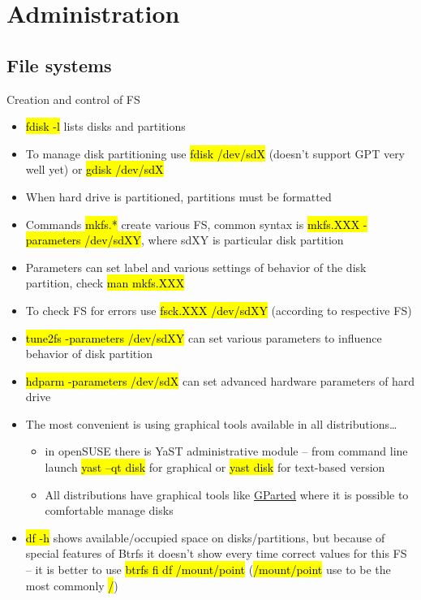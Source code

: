 \documentclass[compress, ucs, xelatex, 11pt, xcolor=svgnames,
  hyperref={
    bookmarks=true,
    unicode=true,
    colorlinks=true,
    pdftitle={Linux, command line and MetaCentrum},
    plainpages=false,
    pdfauthor={Vojtech Zeisek},
    pdfsubject={Course about use of Linux command line, writing shell scripts and using MetaCentrum of CESNET},
    pdfcreator={XeLaTeX},
    pdfkeywords={Linux, GNU, BASH, shell, command line, MetaCentrum},
    linkcolor=DarkRed,
    anchorcolor=DarkBlue,
    citecolor=Indigo,
    filecolor=NavyBlue,
    menucolor=DarkMagenta,
    urlcolor=DarkBlue,
    pdftex},
  url={hyphens, lowtilde} %
  ]{beamer}
\renewcommand{\texttt}[1]{\hl{\ttfamily #1}}
\begin{document}
\section{Administration}

\subsection{File systems}

\begin{frame}[allowframebreaks]{Creation and control of FS}
\begin{itemize}
  \item \texttt{fdisk -l} lists disks and partitions
  \item To manage disk partitioning use \texttt{fdisk /dev/sdX} (doesn't support GPT very well yet) or \texttt{gdisk /dev/sdX}
  \item When hard drive is partitioned, partitions must be formatted
  \item Commands \texttt{mkfs.*} create various FS, common syntax is \texttt{mkfs.XXX -parameters /dev/sdXY}, where sdXY is particular disk partition
  \item Parameters can set label and various settings of behavior of the disk partition, check \texttt{man mkfs.XXX}
  \item To check FS for errors use \texttt{fsck.XXX /dev/sdXY} (according to respective FS)
  \item \texttt{tune2fs -parameters /dev/sdXY} can set various parameters to influence behavior of disk partition
  \item \texttt{hdparm -parameters /dev/sdX} can set advanced hardware parameters of hard drive
  \item The most convenient is using graphical tools available in all distributions\ldots
  \begin{itemize}
    \item in openSUSE there is YaST administrative module -- from command line launch \texttt{yast --qt disk} for graphical or \texttt{yast disk} for text-based version
    \item All distributions have graphical tools like \href{http://gparted.org/}{GParted} where it is possible to comfortable manage disks
  \end{itemize}
  \item \texttt{df -h} shows available/occupied space on disks/partitions, but because of special features of Btrfs it doesn't show every time correct values for this FS -- it is better to use \texttt{btrfs fi df /mount/point} (\texttt{/mount/point} use to be the most commonly \texttt{/})
\end{itemize}
\end{frame}
\end{document}
